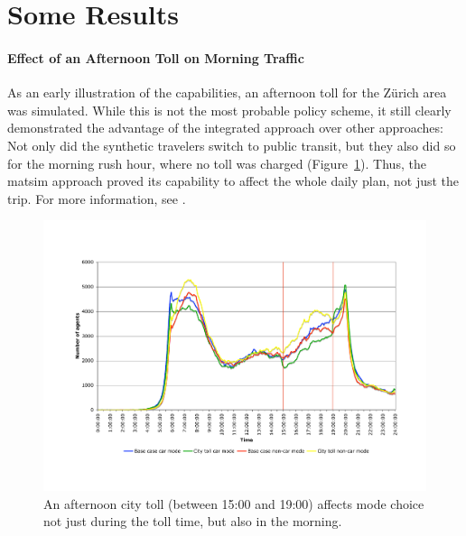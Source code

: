 \section{Some Results}

\paragraph{Effect of an Afternoon Toll on Morning Traffic}

As an early illustration of the capabilities, an afternoon toll for the Zürich area was simulated.  While this is not the most probable policy scheme, it still clearly demonstrated the advantage of the integrated approach over other approaches: Not only did the synthetic travelers switch to public transit, but they also did so for the morning rush hour, where no toll was charged (Figure~\ref{fig:afternoon-toll}).  Thus, the \acrshort{matsim} approach proved its capability to affect the whole daily plan, not just the trip.  For more information, see \cite{RieserEtAl_TRBTDF_2008}.

\begin{figure}[!h!t]
\centerline{%
\includegraphics[width=0.99\hsize,trim=2cm 2.5cm 2cm 3cm,clip]{extending/figures/roadpricing/583vs585onRoute.pdf}
}
\caption{An afternoon city toll (between 15:00 and 19:00) affects mode choice not just during the toll time, but also in the morning.}
\label{fig:afternoon-toll}
\end{figure}



